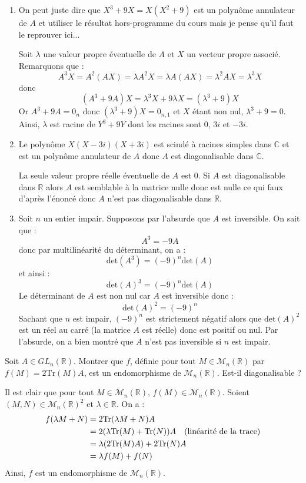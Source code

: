 \documentclass[a4paper,10pt]{report}
\begin{document}
\begin{enumerate}
\item On peut juste dire que $X^3+9X=X(X^2+9)$ est un polynôme annulateur de $A$ et utiliser le résultat hors-programme du cours mais je pense qu'il faut le reprouver ici...

\medskip

\noindent Soit $\lambda$ une valeur propre éventuelle de $A$ et $X$ un vecteur propre associé. Remarquons que :
$$ A^3 X= A^2(AX)= \lambda A^2X = \lambda A(AX) = \lambda^2 AX = \lambda^3 X$$
donc
$$ (A^3+9A)X = \lambda ^3 X+ 9 \lambda X = (\lambda^3+9)X$$
Or $ A^3+9A=0_n$ donc $(\lambda^3+9)X= 0_{n,1}$ et $X$ étant non nul, $\lambda^3+9=0$. Ainsi, $\lambda$ est racine de $Y^3+9Y$ dont les racines sont $0$, $3i$ et $-3i$.
\item Le polynôme $X(X-3i)(X+3i)$ est scindé à racines simples dans $\mathbb{C}$ et est un polynôme annulateur de $A$ donc $A$ est diagonalisable dans $\mathbb{C}$.

\medskip

\noindent La seule valeur propre réelle éventuelle de $A$ est $0$. Si $A$ est diagonalisable dans $\mathbb{R}$ alors $A$ est semblable à la matrice nulle donc est nulle ce qui faux d'après l'énoncé donc $A$ n'est pas diagonalisable dans $\mathbb{R}$.

\item Soit $n$ un entier impair. Supposons par l'absurde que $A$ est inversible. On sait que :
$$ A^3 = -9A$$
donc par multilinéarité du déterminant, on a :
$$ \textrm{det}(A^3) = (-9)^n \textrm{det}(A)$$
et ainsi :
$$ \textrm{det}(A)^3 = (-9)^n \textrm{det}(A)$$
Le déterminant de $A$ est non nul car $A$ est inversible donc :
$$ \textrm{det}(A)^2 = (-9)^n $$
Sachant que $n$ est impair, $(-9)^n$ est strictement négatif alors que $\textrm{det}(A)^2$ est un réel au carré (la matrice $A$ est réelle) donc est positif ou nul. Par l'absurde, on a bien montré que $A$ n'est pas inversible si $n$ est impair. 
\end{enumerate}

\begin{Exercice}{} Soit $A \in GL_n(\mathbb{R})$. Montrer que $f$, définie pour tout $M \in \mathcal{M}_n(\mathbb{R})$ par $f(M)= 2 \textrm{Tr}(M) A$, est un endomorphisme de $\mathcal{M}_n(\mathbb{R})$. Est-il diagonalisable ?
\end{Exercice}

\corr Il est clair que pour tout $M \in \mathcal{M}_n(\mathbb{R})$, $f(M) \in \mathcal{M}_n(\mathbb{R})$. Soient $(M,N) \in \mathcal{M}_n(\mathbb{R})^2$ et $\lambda \in \mathbb{R}$. On a :
\begin{align*}
f(\lambda M + N) & = 2 \textrm{Tr}(\lambda M + N) A \\
& = 2 (\lambda \textrm{Tr}(M) +  \textrm{Tr}(N))A \quad \hbox{(linéarité de la trace)} \\
& =\lambda (2 \textrm{Tr}(M)A) + 2 \textrm{Tr}(N)A \\
&= \lambda f(M) + f(N)
\end{align*}
Ainsi, $f$ est un endomorphisme de $\mathcal{M}_n(\mathbb{R})$.
\end{document}
